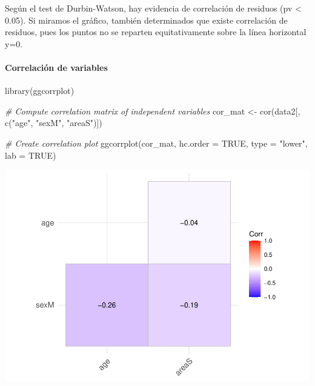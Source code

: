 \documentclass[
]{article}
\newenvironment{Shaded}{\begin{snugshade}}{\end{snugshade}}
\newcommand{\AttributeTok}[1]{\textcolor[rgb]{0.77,0.63,0.00}{#1}}
\newcommand{\CommentTok}[1]{\textcolor[rgb]{0.56,0.35,0.01}{\textit{#1}}}
\newcommand{\ConstantTok}[1]{\textcolor[rgb]{0.00,0.00,0.00}{#1}}
\newcommand{\FunctionTok}[1]{\textcolor[rgb]{0.00,0.00,0.00}{#1}}
\newcommand{\NormalTok}[1]{#1}
\newcommand{\OtherTok}[1]{\textcolor[rgb]{0.56,0.35,0.01}{#1}}
\newcommand{\SpecialCharTok}[1]{\textcolor[rgb]{0.00,0.00,0.00}{#1}}
\newcommand{\StringTok}[1]{\textcolor[rgb]{0.31,0.60,0.02}{#1}}
\begin{document}
Según el test de Durbin-Watson, hay evidencia de correlación de residuos
(pv \textless{} 0.05). Si miramos el gráfico, también determinados que
existe correlación de residuos, pues los puntos no se reparten
equitativamente sobre la línea horizontal y=0.

\hypertarget{correlaciuxf3n-de-variables}{%
\paragraph{Correlación de variables}\label{correlaciuxf3n-de-variables}}

\begin{Shaded}
\begin{Highlighting}[]
\FunctionTok{library}\NormalTok{(ggcorrplot)}

\CommentTok{\# Compute correlation matrix of independent variables}
\NormalTok{cor\_mat }\OtherTok{\textless{}{-}} \FunctionTok{cor}\NormalTok{(data2[, }\FunctionTok{c}\NormalTok{(}\StringTok{"age"}\NormalTok{, }\StringTok{"sexM"}\NormalTok{, }\StringTok{"areaS"}\NormalTok{)])}

\CommentTok{\# Create correlation plot}
\FunctionTok{ggcorrplot}\NormalTok{(cor\_mat, }\AttributeTok{hc.order =} \ConstantTok{TRUE}\NormalTok{, }\AttributeTok{type =} \StringTok{"lower"}\NormalTok{, }\AttributeTok{lab =} \ConstantTok{TRUE}\NormalTok{)}
\end{Highlighting}
\end{Shaded}

\includegraphics{code_files/figure-latex/unnamed-chunk-20-1.pdf}

\begin{Shaded}
\end{Shaded}
\end{document}
